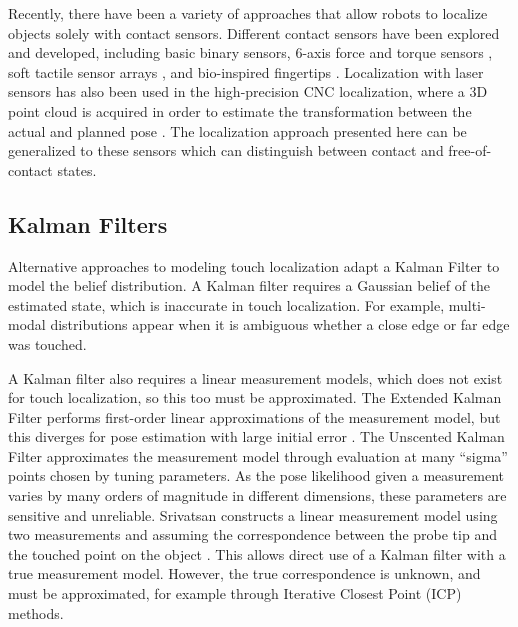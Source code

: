 \documentclass[../thesis.tex]{subfiles}
\begin{document}
Recently, there have been a variety of approaches that allow robots to localize objects solely with contact sensors. Different contact sensors have been explored and developed, including basic binary sensors, 6-axis force and torque sensors \cite{del2012control}, soft tactile sensor arrays \cite{hammond2012soft}, and bio-inspired fingertips \cite{fishel2012sensing}. Localization with laser sensors has also been used in the high-precision CNC localization, where a 3D point cloud is acquired in order to estimate the transformation between the actual and planned pose \cite{rajaraman2013automated}.
The localization approach presented here can be generalized to these sensors which can distinguish between contact and free-of-contact states.



\subsection{Kalman Filters}
Alternative approaches to modeling touch localization adapt a Kalman Filter to model the belief distribution.
A Kalman filter requires a Gaussian belief of the estimated state, which is inaccurate in touch localization. 
For example, multi-modal distributions appear when it is ambiguous whether a close edge or far edge was touched. %

A Kalman filter also requires a linear measurement models, which does not exist for touch localization, so this too must be approximated.
The Extended Kalman Filter performs first-order linear approximations of the measurement model, but this diverges for pose estimation with large initial error \cite{Choukroun2006}.
The Unscented Kalman Filter approximates the measurement model through evaluation at many ``sigma'' points chosen by tuning parameters.
As the pose likelihood given a measurement varies by many orders of magnitude in different dimensions, these parameters are sensitive and unreliable.
Srivatsan constructs a linear measurement model using two measurements and assuming the correspondence between the probe tip and the touched point on the object \cite{Srivatsan}.
This allows direct use of a Kalman filter with a true measurement model.
However, the true correspondence is unknown, and must be approximated, for example through Iterative Closest Point (ICP) methods.




\end{document}

